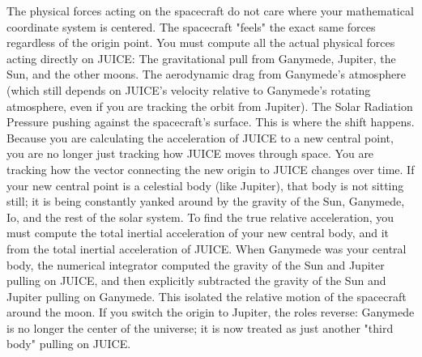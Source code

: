 {}The physical forces acting on the spacecraft do not care where your mathematical coordinate system is centered. The spacecraft "feels" the exact same forces regardless of the origin point.\markdownRendererInterblockSeparator
{}You must compute all the actual physical forces acting directly on JUICE:\markdownRendererInterblockSeparator
{}\markdownRendererUlBegin
\markdownRendererUlItem The gravitational pull from Ganymede, Jupiter, the Sun, and the other moons.\markdownRendererUlItemEnd 
\markdownRendererUlItem The aerodynamic drag from Ganymede's atmosphere (which still depends on JUICE's velocity relative to Ganymede's rotating atmosphere, even if you are tracking the orbit from Jupiter).\markdownRendererUlItemEnd 
\markdownRendererUlItem The Solar Radiation Pressure pushing against the spacecraft's surface.\markdownRendererUlItemEnd 
\markdownRendererUlEnd \markdownRendererInterblockSeparator
{}
\markdownRendererSectionEnd \markdownRendererSectionBegin
{}\markdownRendererInterblockSeparator
{}This is where the shift happens. Because you are calculating the acceleration of JUICE  to a new central point, you are no longer just tracking how JUICE moves through space. You are tracking how the vector connecting the new origin to JUICE changes over time.\markdownRendererInterblockSeparator
{}If your new central point is a celestial body (like Jupiter), that body is not sitting still; it is being constantly yanked around by the gravity of the Sun, Ganymede, Io, and the rest of the solar system.\markdownRendererInterblockSeparator
{}To find the true relative acceleration, you must compute the total inertial acceleration of your new central body, and  it from the total inertial acceleration of JUICE.\markdownRendererInterblockSeparator
{}
\markdownRendererSectionEnd \markdownRendererSectionBegin
{}\markdownRendererInterblockSeparator
{}When Ganymede was your central body, the numerical integrator computed the gravity of the Sun and Jupiter pulling on JUICE, and then explicitly subtracted the gravity of the Sun and Jupiter pulling on Ganymede. This isolated the relative motion of the spacecraft around the moon.\markdownRendererInterblockSeparator
{}If you switch the origin to Jupiter, the roles reverse:\markdownRendererInterblockSeparator
{}\markdownRendererUlBegin
\markdownRendererUlItem Ganymede is no longer the center of the universe; it is now treated as just another "third body" pulling on JUICE.\markdownRendererUlItemEnd 
